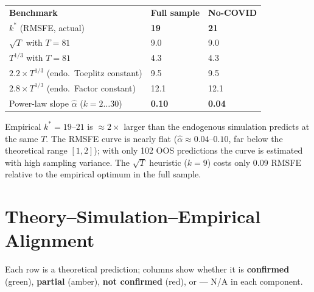 \documentclass[11pt,a4paper]{article}
\newcommand{\ck}[1]{\textcolor{mygreen}{\textbf{#1}}}
\newcommand{\pa}[1]{\textcolor{myamber}{\textbf{#1}}}
\newcommand{\no}[1]{\textcolor{myred}{\textbf{#1}}}
\newcommand{\na}{\textcolor{dgrey}{--- N/A}}
\newcommand{\kstar}{k^*}
\newcommand{\ahat}{\hat{\alpha}}
\begin{document}
\smallskip
\begin{tabular}{L{7.0cm} C{1.8cm} C{1.8cm}}
\color{white}\bfseries Benchmark &
\color{white}\bfseries Full sample &
\color{white}\bfseries No-COVID \\
\(\kstar\) (RMSFE, actual) & \no{19} & \no{21} \\
\(\sqrt{T}\) with \(T=81\) & 9.0 & 9.0 \\
\(T^{1/3}\) with \(T=81\) & 4.3 & 4.3 \\
\(2.2\times T^{1/3}\) (endo.\ Toeplitz constant) & 9.5 & 9.5 \\
\(2.8\times T^{1/3}\) (endo.\ Factor constant) & 12.1 & 12.1 \\
Power-law slope \(\ahat\) (\(k=2\ldots30\)) & \pa{0.10} & \pa{0.04} \\
\end{tabular}

\smallskip\noindent
Empirical \(\kstar=19\text{--}21\) is \(\approx2\times\) larger than the endogenous simulation predicts at the same \(T\).
The RMSFE curve is nearly flat (\(\ahat\approx0.04\text{--}0.10\), far below the theoretical range \([1,2]\));
with only 102 OOS predictions the curve is estimated with high sampling variance.
The \(\sqrt{T}\) heuristic (\(k=9\)) costs only 0.09 RMSFE relative to the empirical optimum in the full sample.

\section{Theory--Simulation--Empirical Alignment}

Each row is a theoretical prediction; columns show whether it is
\ck{confirmed} (green), \pa{partial} (amber), \no{not confirmed} (red),
or \na{} in each component.
\end{document}
